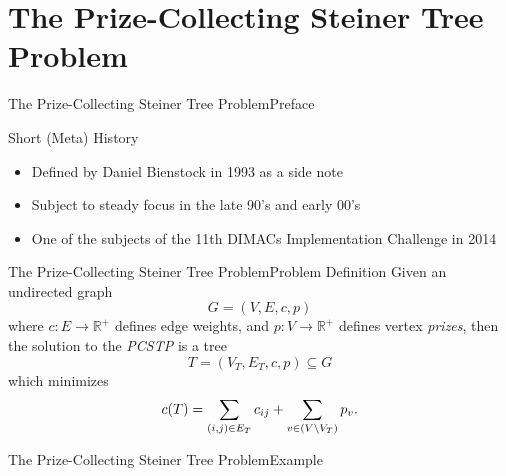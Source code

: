 \documentclass[rgb,dvipsnames]{beamer}
\newcommand{\RR}{\mathbb{R}}      %
\begin{document}
\section{The Prize-Collecting Steiner Tree Problem}
\begin{frame}{The Prize-Collecting Steiner Tree Problem}{Preface}
  \begin{block}{Short (Meta) History}
  \begin{itemize}[<+->]
  \item Defined by Daniel Bienstock in 1993 as a side note
  \item Subject to steady focus in the late 90's and early 00's
  \item One of the subjects of the 11th DIMACs Implementation Challenge in 2014
  \end{itemize}
  \end{block}
\end{frame}
\begin{frame}{The Prize-Collecting Steiner Tree Problem}{Problem Definition}
 Given an undirected graph
\[G = (V, E, c, p)\]
where $c: E \to \RR^+$ defines edge weights,
and $p: V \to \RR^+$ defines vertex \textit{prizes}, then the solution to the
\textit{PCSTP} is a tree
\[T = (V_T, E_T, c, p) \subseteq G\]
which minimizes
\[c(T) = \sum_{(i,j) \in E_T} c_{ij} + \sum_{v\in (V \setminus V_T)} p_v \textnormal{.} \]
\end{frame}

\begin{frame}{The Prize-Collecting Steiner Tree Problem}{Example}
  \centering
\end{frame}
\end{document}
